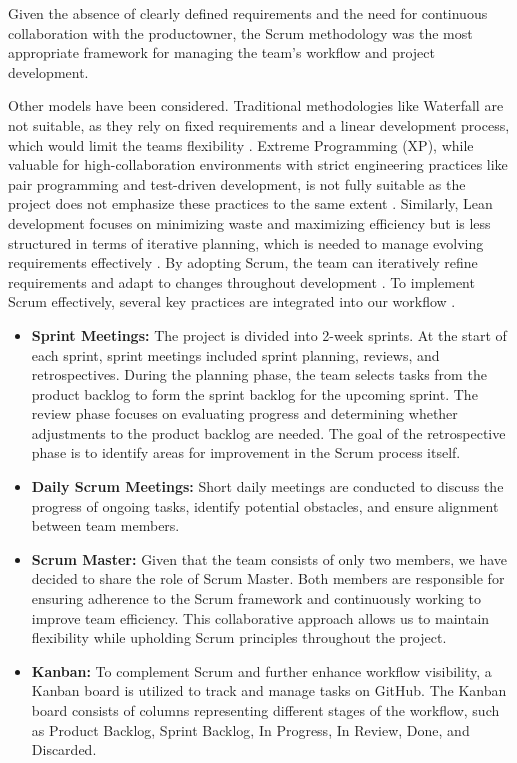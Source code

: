 Given the absence of clearly defined requirements and the need for continuous collaboration with the \gls{productowner}, the Scrum methodology was the most appropriate framework for managing the team's workflow and project development. 

Other models have been considered. Traditional methodologies like Waterfall are not suitable, as they rely on fixed requirements and a linear development process, which would limit the teams flexibility \cite{waterfall_model_enwiki:1275499744}. Extreme Programming (XP), while valuable for high-collaboration environments with strict engineering practices like pair programming and test-driven development, is not fully suitable as the project does not emphasize these practices to the same extent \cite{extreme_programming}. Similarly, Lean development focuses on minimizing waste and maximizing efficiency but is less structured in terms of iterative planning, which is needed to manage evolving requirements effectively \cite{lean_programming}. By adopting Scrum, the team can iteratively refine requirements and adapt to changes throughout development \cite{sdlc_model}. To implement Scrum effectively, several key practices are integrated into our workflow \cite{scrum_guide}.

\begin{itemize}
    \item \textbf{Sprint Meetings:} The project is divided into 2-week sprints. At the start of each sprint, sprint meetings included sprint planning, reviews, and retrospectives. During the planning phase, the team selects tasks from the product backlog to form the sprint backlog for the upcoming sprint. The review phase focuses on evaluating progress and determining whether adjustments to the product backlog are needed. The goal of the retrospective phase is to identify areas for improvement in the Scrum process itself.
    \item \textbf{Daily Scrum Meetings:} Short daily meetings are conducted to discuss the progress of ongoing tasks, identify potential obstacles, and ensure alignment between team members. 
    \item \textbf{Scrum Master:} Given that the team consists of only two members, we have decided to share the role of Scrum Master. Both members are responsible for ensuring adherence to the Scrum framework and continuously working to improve team efficiency. This collaborative approach allows us to maintain flexibility while upholding Scrum principles throughout the project.
    \item \textbf{Kanban:} To complement Scrum and further enhance workflow visibility, a Kanban board is utilized to track and manage tasks on GitHub. The Kanban board consists of columns representing different stages of the workflow, such as Product Backlog, Sprint Backlog, In Progress, In Review, Done, and Discarded.
\end{itemize}

